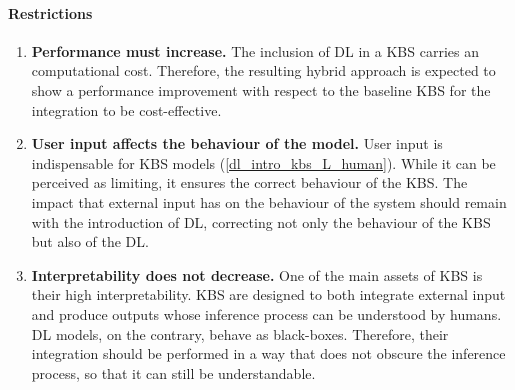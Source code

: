 \paragraph{Restrictions}
\begin{enumerate} [start=1,label={\bfseries R\arabic*.}]
    \item \textbf{Performance must increase.} \label{dlinstrokbs_R_performance} The inclusion of DL in a KBS carries an computational cost. Therefore, the resulting hybrid approach is expected to show a performance improvement with respect to the baseline KBS for the integration to be cost-effective. 
    
    \item \textbf{User input affects the behaviour of the model.}\label{dlintrokbs_R_user} User input is indispensable for KBS models (\ref{dl_intro_kbs_L_human}). While it can be perceived as limiting, it ensures the correct behaviour of the KBS. The impact that external input has on the behaviour of the system should remain with the introduction of DL, correcting not only the behaviour of the KBS but also of the DL.
    
    \item \textbf{Interpretability does not decrease.}\label{dlintrokbs_LR_interpretability} One of the main assets of KBS is their high interpretability. KBS are designed to both integrate external input and produce outputs whose inference process can be understood by humans. DL models, on the contrary, behave as black-boxes. Therefore, their integration should be performed in a way that does not obscure the inference process, so that it can still be understandable.
    
\end{enumerate}
